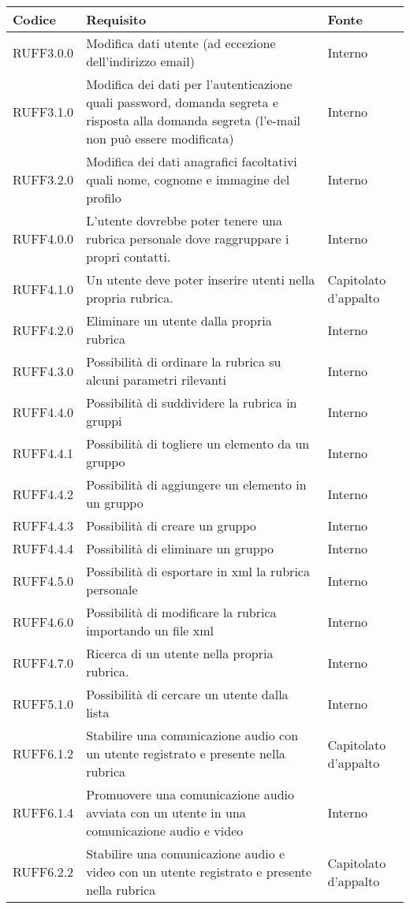 \begin{center}
\begin{longtable}{lp{}l}
\toprule Codice & Requisito & Fonte\\
\midrule
RUFF3.0.0 & Modifica dati utente (ad eccezione dell'indirizzo email) & Interno \\
RUFF3.1.0 & Modifica dei dati per l'autenticazione quali password, domanda segreta e risposta alla domanda segreta (l'e-mail non può essere modificata) & Interno \\
RUFF3.2.0 & Modifica dei dati anagrafici facoltativi quali nome, cognome e immagine del profilo & Interno \\
RUFF4.0.0 & L'utente dovrebbe poter tenere una rubrica personale dove raggruppare i propri contatti. & Interno \\
RUFF4.1.0 & Un utente deve poter inserire utenti nella propria rubrica. & Capitolato d'appalto \\
RUFF4.2.0 & Eliminare un utente dalla propria rubrica & Interno \\
RUFF4.3.0 & Possibilità di ordinare la rubrica su alcuni parametri rilevanti & Interno \\
RUFF4.4.0 & Possibilità di suddividere la rubrica in gruppi & Interno \\
RUFF4.4.1 & Possibilità di togliere un elemento da un gruppo & Interno \\
RUFF4.4.2 & Possibilità di aggiungere un elemento in un gruppo & Interno \\
RUFF4.4.3 & Possibilità di creare un gruppo & Interno \\
RUFF4.4.4 & Possibilità di eliminare un gruppo & Interno \\
RUFF4.5.0 & Possibilità di esportare in xml la rubrica personale & Interno \\
RUFF4.6.0 & Possibilità di modificare la rubrica importando un file xml & Interno \\
RUFF4.7.0 & Ricerca di un utente nella propria rubrica. & Interno \\
RUFF5.1.0 & Possibilità di cercare un utente dalla lista & Interno \\
RUFF6.1.2 & Stabilire una comunicazione audio con un utente registrato e presente nella rubrica & Capitolato d'appalto \\
RUFF6.1.4 & Promuovere una comunicazione audio avviata con un utente in una comunicazione audio e video & Interno \\
RUFF6.2.2 & Stabilire una comunicazione audio e video con un utente registrato e presente nella rubrica & Capitolato d'appalto \\

\end{longtable}
\end{center}
